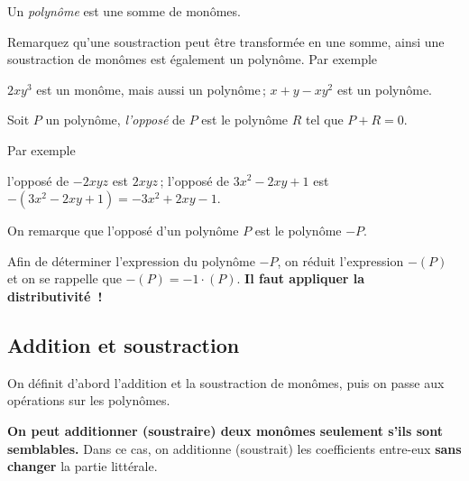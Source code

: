 \documentclass[a4paper,12pt]{report}
\begin{document}
\begin{defi}[polynômes]
	Un \emph{polynôme} est une somme de monômes. 
\end{defi}
Remarquez qu'une soustraction peut être transformée en une somme, ainsi une soustraction de monômes est également un polynôme. Par exemple
\begin{tasks}
	\task $2xy^3$ est un monôme, mais aussi un polynôme\,;
	\task $x+y-xy^2$ est un polynôme.
\end{tasks}
\begin{defi}[opposé]
Soit $P$ un polynôme, \emph{l'opposé} de $P$ est le polynôme $R$ tel que $P+R=0$.	
\end{defi}
Par exemple
\begin{tasks}
	\task l'opposé de $-2xyz$ est $2xyz$\,;
	\task l'opposé de $3x^2-2xy+1$ est $-(3x^2-2xy+1)=-3x^2+2xy-1$.
\end{tasks}
On remarque que l'opposé d'un polynôme $P$ est le polynôme $-P$. 

\begin{rem}
	Afin de déterminer l'expression du polynôme $-P$, on réduit l'expression $-(P)$ et on se rappelle que $-(P)=-1\cdot (P)$.
	{\bfseries Il faut appliquer la distributivité~!} 
\end{rem}
\subsection{Addition et soustraction}
On définit d'abord l'addition et la soustraction de monômes, puis on passe aux opérations sur les polynômes.

{\bfseries On peut additionner (soustraire) deux monômes seulement s'ils sont semblables.} Dans ce cas, on additionne (soustrait) les coefficients entre-eux {\bfseries sans changer} la partie littérale.
\end{document}
